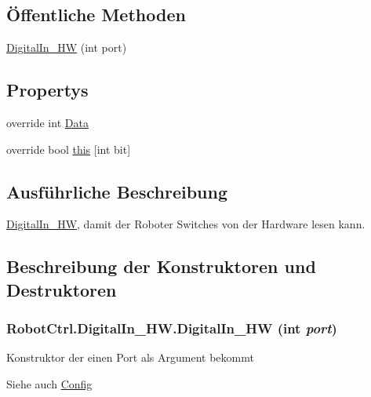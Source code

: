 \subsection*{Öffentliche Methoden}
\begin{DoxyCompactItemize}
\item 
\hyperlink{class_robot_ctrl_1_1_digital_in___h_w_a50234a4b44c4c522abe6565a3111309e}{DigitalIn\_\-HW} (int port)
\end{DoxyCompactItemize}
\subsection*{Propertys}
\begin{DoxyCompactItemize}
\item 
override int \hyperlink{class_robot_ctrl_1_1_digital_in___h_w_a22093ed6e3a1b15bbb0406fd56d9b0cc}{Data}
\item 
override bool \hyperlink{class_robot_ctrl_1_1_digital_in___h_w_a1197c7dee03f1a9844a5824e3c6e0941}{this} \mbox{[}int bit\mbox{]}
\end{DoxyCompactItemize}


\subsection{Ausführliche Beschreibung}
\hyperlink{class_robot_ctrl_1_1_digital_in___h_w}{DigitalIn\_\-HW}, damit der Roboter Switches von der Hardware lesen kann. 

\subsection{Beschreibung der Konstruktoren und Destruktoren}
\hypertarget{class_robot_ctrl_1_1_digital_in___h_w_a50234a4b44c4c522abe6565a3111309e}{
\subsubsection[{DigitalIn\_\-HW}]{\setlength{\rightskip}{0pt plus 5cm}RobotCtrl.DigitalIn\_\-HW.DigitalIn\_\-HW (int {\em port})}}
\label{class_robot_ctrl_1_1_digital_in___h_w_a50234a4b44c4c522abe6565a3111309e}
Konstruktor der einen Port als Argument bekommt \begin{DoxySeeAlso}{Siehe auch}
\hyperlink{class_robot_ctrl_1_1_config}{Config}
\end{DoxySeeAlso}

